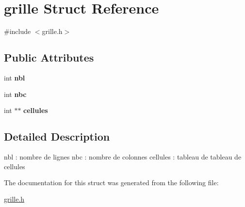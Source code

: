 \hypertarget{structgrille}{}\section{grille Struct Reference}
\label{structgrille}


{\ttfamily \#include $<$grille.\+h$>$}

\subsection*{Public Attributes}
\begin{DoxyCompactItemize}
\item 
\mbox{\label{structgrille_a0b4da1e205825df205b0c004d105d62a}} 
int {\bfseries nbl}
\item 
\mbox{\label{structgrille_a48d6706d41bee6fff9200d872b8b0cd0}} 
int {\bfseries nbc}
\item 
\mbox{\label{structgrille_a428cf0c0297ce04e0206ba0067ac3b42}} 
int $\ast$$\ast$ {\bfseries cellules}
\end{DoxyCompactItemize}


\subsection{Detailed Description}
nbl \+: nombre de lignes nbc \+: nombre de colonnes cellules \+: tableau de tableau de cellules 

The documentation for this struct was generated from the following file\+:\begin{DoxyCompactItemize}
\item 
\hyperlink{grille_8h}{grille.\+h}\end{DoxyCompactItemize}
